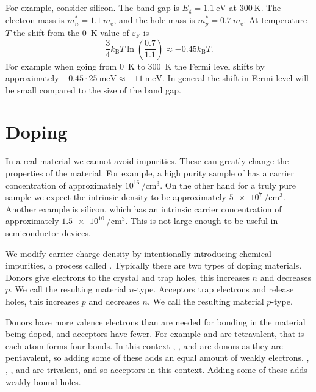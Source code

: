 \documentclass[fleqn]{NotesClass}
\newcommand*{\boltzmann}{k_{\mathrm{B}}}
\newcommand*{\electronmass}{m_{\mathrm{e}}}
\newcommand*{\fermi}{\mathrm{F}}
\begin{document}
    For example, consider silicon.
    The band gap is \(E_{\mathrm{g}} = \qty{1.1}{\electronvolt}\) at \(\qty{300}{\kelvin}\).
    The electron mass is \(m_n^* = \qty{1.1}{\electronmass}\), and the hole mass is \(m_p^* = \qty{0.7}{\electronmass}\).
    At temperature \(T\) the shift from the \qty{0}{\kelvin} value of \(\varepsilon_{\fermi}\) is
    \begin{equation}
        \frac{3}{4}\boltzmann T \ln\left( \frac{0.7}{1.1} \right) \approx -0.45\boltzmann T.
    \end{equation}
    For example when going from \qty{0}{\kelvin} to \qty{300}{\kelvin} the Fermi level shifts by approximately \(-0.45\cdot \qty{25}{\milli\electronvolt} \approx \qty{-11}{\milli\electronvolt}\).
    In general the shift in Fermi level will be small compared to the size of the band gap.
    
    \section{Doping}
    In a real material we cannot avoid impurities.
    These can greatly change the properties of the material.
    For example, a high purity sample of  has a carrier concentration of approximately \(10^{16}\,\unit{\per\centi\metre\cubed}\).
    On the other hand for a truly pure sample we expect the intrinsic density to be approximately \(\qty{5e7}{\per\centi\metre\cubed}\).
    Another example is silicon, which has an intrinsic carrier concentration of approximately \(\qty{1.5e10}{\per\centi\metre\cubed}\).
    This is not large enough to be useful in semiconductor devices.
    
    We modify carrier charge density by intentionally introducing chemical impurities, a process called .
    Typically there are two types of doping materials.
    Donors give electrons to the crystal and trap holes, this increases \(n\) and decreases \(p\).
    We call the resulting material \(n\)-type.
    Acceptors trap electrons and release holes, this increases \(p\) and decreases \(n\).
    We call the resulting material \(p\)-type.
    
    Donors have more valence electrons than are needed for bonding in the material being doped, and acceptors have fewer.
    For example  and  are tetravalent, that is each atom forms four bonds.
    In this context , , and  are donors as they are pentavalent, so adding some of these adds an equal amount of weakly electrons.
    , , , and  are trivalent, and so acceptors in this context.
    Adding some of these adds weakly bound holes.
    
\end{document}
